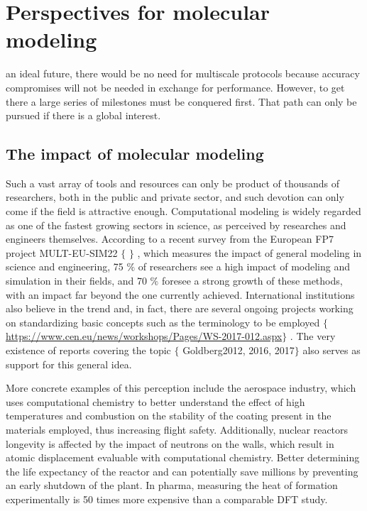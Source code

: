 \chapter{Perspectives for molecular modeling}
\label{chap:appendix-a}

 an ideal future, there would be no need for multiscale protocols because accuracy compromises will not be needed in exchange for performance. However, to get there a large series of milestones must be conquered first. That path can only be pursued if there is a global interest.

\section*{The impact of molecular modeling}
\label{molecular-modeling-impact}

Such a vast array of tools and resources can only be product of thousands of researchers, both in the public and private sector, and such devotion can only come if the field is attractive enough. Computational modeling is widely regarded as one of the fastest growing sectors in science, as perceived by researches and engineers themselves. According to a recent survey from the European FP7 project MULT-EU-SIM22 $ \{ $ $ \} $ , which measures the impact of general modeling in science and engineering, 75 $\%$  of researchers see a high impact of modeling and simulation in their fields, and 70 $\%$  foresee a strong growth of these methods, with an impact far beyond the one currently achieved.\cite{ENN2012} International institutions also believe in the trend and, in fact, there are several ongoing projects working on standardizing basic concepts such as the terminology to be employed $ \{ $ \href{https://www.cen.eu/news/workshops/Pages/WS-2017-012.aspx}{https://www.cen.eu/news/workshops/Pages/WS-2017-012.aspx}$ \} $ . The very existence of reports covering the topic $ \{ $ Goldberg2012, 2016, 2017$ \} $  also serves as support for this general idea.

More concrete examples of this perception include the aerospace industry, which uses computational chemistry to better understand the effect of high temperatures and combustion on the stability of the coating present in the materials employed, thus increasing flight safety. Additionally, nuclear reactors longevity is affected by the impact of neutrons on the walls, which result in atomic displacement evaluable with computational chemistry. Better determining the life expectancy of the reactor and can potentially save millions by preventing an early shutdown of the plant.\cite{UKeconomics} In pharma, measuring the heat of formation experimentally is 50 times more expensive than a comparable DFT study.\cite{maginn2009}

